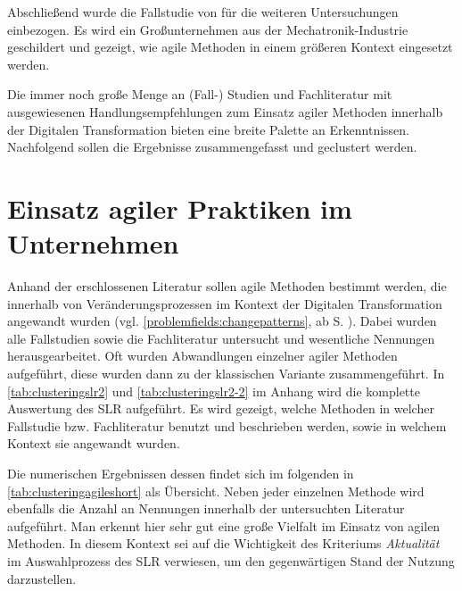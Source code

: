 Abschließend wurde die Fallstudie von  für die weiteren Untersuchungen einbezogen. Es wird ein Großunternehmen aus der Mechatronik-Industrie geschildert und gezeigt, wie agile Methoden in einem größeren Kontext eingesetzt werden. 

Die immer noch große Menge an (Fall-) Studien und Fachliteratur mit ausgewiesenen Handlungsempfehlungen zum Einsatz agiler Methoden innerhalb der Digitalen Transformation bieten eine breite Palette an Erkenntnissen. Nachfolgend sollen die Ergebnisse zusammengefasst und geclustert werden.

\section{Einsatz agiler Praktiken im Unternehmen}
\label{agilepractices:extractions}


Anhand der erschlossenen Literatur sollen agile Methoden bestimmt werden, die innerhalb von Veränderungsprozessen im Kontext der Digitalen Transformation angewandt wurden (vgl. \ref{problemfields:changepatterns}, ab S. \pageref{problemfields:changepatterns}). Dabei wurden alle Fallstudien sowie die Fachliteratur untersucht und wesentliche Nennungen herausgearbeitet. Oft wurden Abwandlungen einzelner agiler Methoden aufgeführt, diese wurden dann zu der klassischen Variante zusammengeführt. In  \ref{tab:clusteringslr2} und \ref{tab:clusteringslr2-2} im Anhang wird die komplette Auswertung des SLR aufgeführt. Es wird gezeigt, welche Methoden in welcher Fallstudie bzw. Fachliteratur benutzt und beschrieben werden, sowie in welchem Kontext sie angewandt wurden. 

Die numerischen Ergebnissen dessen findet sich im folgenden in \ref{tab:clusteringagileshort} als Übersicht. Neben jeder einzelnen Methode wird ebenfalls die Anzahl an Nennungen innerhalb der untersuchten Literatur aufgeführt. Man erkennt hier sehr gut eine große Vielfalt im Einsatz von agilen Methoden. In diesem Kontext sei auf die Wichtigkeit des Kriteriums \textit{Aktualität} im Auswahlprozess des SLR verwiesen, um den gegenwärtigen Stand der Nutzung darzustellen.

